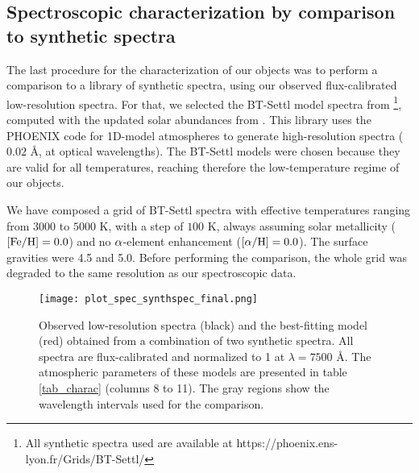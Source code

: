 \documentclass[fleqn,usenatbib]{mnras}
\begin{document}
\subsection{Spectroscopic characterization by comparison to synthetic spectra}
\label{lowres}

The last procedure for the characterization of our objects was to perform a comparison to a library of synthetic spectra, using our observed flux-calibrated low-resolution spectra. For that, we selected the BT-Settl model spectra from \citet{Allard12,Allard13}\footnote{All synthetic spectra used are available at https://phoenix.ens-lyon.fr/Grids/BT-Settl/}, computed with the updated solar abundances from \citet{Asplund09}. This library uses the PHOENIX code for 1D-model atmospheres \citep{Allard94,Allard97,Allard01} to generate high-resolution spectra ($0.02$ \AA, at optical wavelengths). The BT-Settl models were chosen because they are valid for all temperatures, reaching therefore the low-temperature regime of our objects.

We have composed a grid of BT-Settl spectra with effective temperatures ranging from $3000$ to $5000$ K, with a step of $100$ K, always assuming solar metallicity (${\rm [Fe/H]=0.0}$) and no ${\rm \alpha}$-element enhancement (${\rm [\alpha/H]=0.0}$). The surface gravities were 4.5 and 5.0. Before performing the comparison, the whole grid was degraded to the same resolution as our spectroscopic data.


\begin{figure}
\begin{center}
\texttt{[image: plot\_spec\_synthspec\_final.png]}
\caption{Observed low-resolution spectra (black) and the best-fitting model (red) obtained from a combination of two synthetic spectra. All spectra are flux-calibrated and normalized to 1 at $\lambda = 7500$ \AA. The atmospheric parameters of these models are presented in table \ref{tab_charac} (columns 8 to 11). The gray regions show the wavelength intervals used for the comparison.}
\label{figSynthSpec}
\end{center}
\end{figure}
\end{document}
